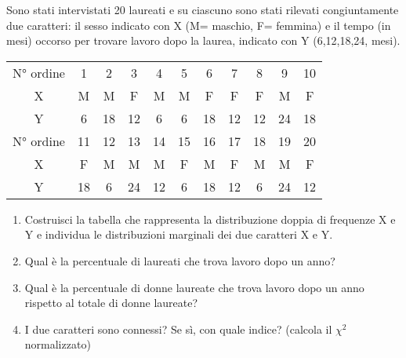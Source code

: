 \begin{esercizio}
\label{ese:c_stat_006}
Sono stati intervistati 20 laureati e su ciascuno sono stati rilevati 
congiuntamente due caratteri: il sesso indicato con X (M= maschio, F= 
femmina) e il tempo (in mesi) occorso per trovare lavoro dopo la laurea, 
indicato con Y (6,12,18,24, mesi).
\begin{center}
\begin{tabular}{ccccccccccc}
\toprule
N° ordine & 1 & 2 & 3 & 4 & 5 & 6 & 7 & 8 & 9 & 10 \\
X & M & M & F & M & M & F & F & F & M & F \\
Y & 6 & 18 & 12 & 6 & 6& 18 & 12 & 12 & 24 & 18\\
\midrule
N° ordine & 11 & 12 & 13 & 14 & 15 & 16 & 17 & 18 & 19 & 20 \\
X & F & M & M & M & F & M & F & M & M & F\\
Y & 18 & 6 & 24 & 12 & 6 & 18 & 12 & 6 &24 & 12\\
\bottomrule
\end{tabular}
\end{center}

\begin{enumerate}
\item Costruisci la tabella che rappresenta la distribuzione doppia 
di frequenze X e Y e individua le distribuzioni marginali dei due 
caratteri X e Y.
\item Qual è la percentuale di laureati che trova lavoro dopo un anno?
\item Qual è la percentuale di donne laureate che trova lavoro dopo 
un anno rispetto al totale di donne laureate?
\item I due caratteri sono connessi? Se sì, con quale indice? 
(calcola il \(\chi^2\) normalizzato)
\end{enumerate}
\end{esercizio}

\subsubsection*{}

